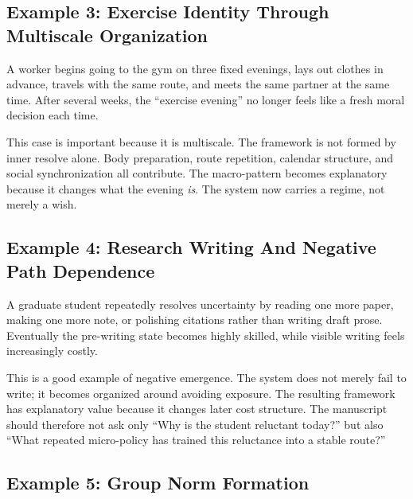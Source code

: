 \subsection{Example 3: Exercise Identity Through Multiscale Organization}

\begin{example}
A worker begins going to the gym on three fixed evenings, lays out clothes in
advance, travels with the same route, and meets the same partner at the same
time. After several weeks, the ``exercise evening'' no longer feels like a
fresh moral decision each time.
\end{example}

\begin{discussion}
This case is important because it is multiscale. The framework is not formed by
inner resolve alone. Body preparation, route repetition, calendar structure,
and social synchronization all contribute. The macro-pattern becomes
explanatory because it changes what the evening \emph{is}. The system now
carries a regime, not merely a wish.
\end{discussion}

\subsection{Example 4: Research Writing And Negative Path Dependence}

\begin{example}
A graduate student repeatedly resolves uncertainty by reading one more paper,
making one more note, or polishing citations rather than writing draft prose.
Eventually the pre-writing state becomes highly skilled, while visible writing
feels increasingly costly.
\end{example}

\begin{discussion}
This is a good example of negative emergence. The system does not merely fail
to write; it becomes organized around avoiding exposure. The resulting
framework has explanatory value because it changes later cost structure. The
manuscript should therefore not ask only ``Why is the student reluctant
today?'' but also ``What repeated micro-policy has trained this reluctance into
a stable route?''
\end{discussion}

\subsection{Example 5: Group Norm Formation}

